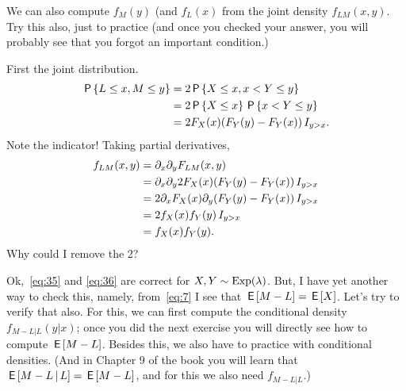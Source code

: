 \documentclass[a4paper,12pt]{article}
\begin{document}
\begin{exercise}
We can also compute $f_{M}(y)$ (and $f_{L}(x)$ from the joint density $f_{LM}(x,y)$. Try this also, just to practice (and once you checked your answer, you will probably see that you forgot an important condition.)
\begin{solution}
First the joint distribution.
  \begin{align}
    \label{eq:51}
\,\mathsf{P}\left\{L\leq x, M \leq y\right\}
&= 2\,\mathsf{P}\left\{X \leq x, x < Y \leq y\right\} \\
&= 2\,\mathsf{P}\left\{X \leq x\right\} \,\mathsf{P}\left\{x < Y \leq y\right\} \\
&= 2 F_{X}(x) (F_Y(y)-F_Y(x)) \,I_{y>x}.
  \end{align}
Note the indicator! 
Taking partial derivatives,
\begin{align}
  \label{eq:52}
f_{LM}(x,y) 
&=\partial_x\partial_{y}F_{LM}(x,y) \\  
&=\partial_x\partial_{y}2 F_{X}(x) (F_Y(y)-F_Y(x)) \,I_{y>x}\\
&=2 \partial_x F_{X}(x) \partial_{y} (F_Y(y)-F_Y(x)) \,I_{y>x} \\
&= 2f_X(x) f_Y(y)\,I_{y>x} \\ 
&= f_X(x) f_Y(y).
\end{align}
Why could I remove the 2?
\end{solution}
\end{exercise}



Ok,~\cref{eq:35} and \cref{eq:36} are correct for $X,Y\sim\mathrm{Exp}(\lambda)$.
But, I have yet another way to check this, namely, from~\cref{eq:7} I see that $\,\mathsf{E}\left[M-L\right] = \,\mathsf{E}\left[X\right]$.
Let's try to verify that also.
For this, we can first compute the conditional density $f_{M-L| L}(y| x)$; once you did the next exercise you will directly see how to compute $\,\mathsf{E}\left[M-L\right]$.
Besides this, we also have to practice with conditional densities.
(And in Chapter 9 of the book you will learn that $\,\mathsf{E}\left[M-L\,\middle|\, L\right] = \,\mathsf{E}\left[M-L\right]$, and for this we also need $f_{M-L|L}$.)
\end{document}
